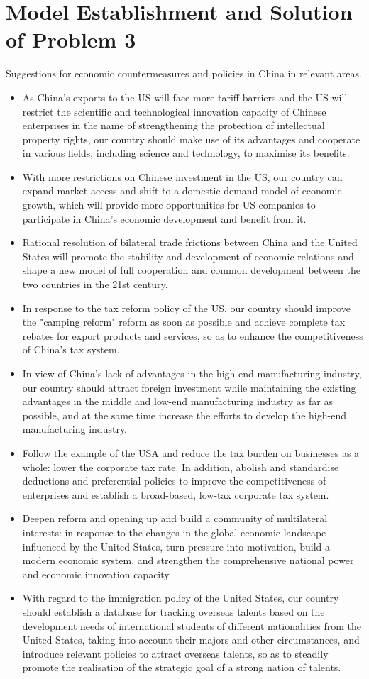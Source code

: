 \documentclass{apmcmthesis}
\begin{document}
\section{Model Establishment and Solution of Problem 3}
Suggestions for economic countermeasures and policies in China in relevant areas.
\begin{itemize}
	\item As China's exports to the US will face more tariff barriers and the US will restrict the scientific and technological innovation capacity of Chinese enterprises in the name of strengthening the protection of intellectual property rights, our country should make use of its advantages and cooperate in various fields, including science and technology, to maximise its benefits. 
	\item With more restrictions on Chinese investment in the US, our country can expand market access and shift to a domestic-demand model of economic growth, which will provide more opportunities for US companies to participate in China's economic development and benefit from it.
	\item Rational resolution of bilateral trade frictions between China and the United States will promote the stability and development of economic relations and shape a new model of full cooperation and common development between the two countries in the 21st century.
	\item In response to the tax reform policy of the US, our country should improve the "camping reform" reform as soon as possible and achieve complete tax rebates for export products and services, so as to enhance the competitiveness of China's tax system.
	\item In view of China's lack of advantages in the high-end manufacturing industry, our country should attract foreign investment while maintaining the existing advantages in the middle and low-end manufacturing industry as far as possible, and at the same time increase the efforts to develop the high-end manufacturing industry.
	\item Follow the example of the USA and reduce the tax burden on businesses as a whole: lower the corporate tax rate. In addition, abolish and standardise deductions and preferential policies to improve the competitiveness of enterprises and establish a broad-based, low-tax corporate tax system. 
	\item Deepen reform and opening up and build a community of multilateral interests: in response to the changes in the global economic landscape influenced by the United States, turn pressure into motivation, build a modern economic system, and strengthen the comprehensive national power and economic innovation capacity.
	\item With regard to the immigration policy of the United States, our country should establish a database for tracking overseas talents based on the development needs of international students of different nationalities from the United States, taking into account their majors and other circumstances, and introduce relevant policies to attract overseas talents, so as to steadily promote the realisation of the strategic goal of a strong nation of talents.
\end{itemize}
\end{document}
